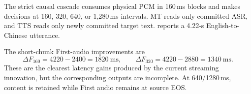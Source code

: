 \documentclass[11pt,a4paper]{article}
\begin{document}
The strict causal cascade consumes physical PCM in 160\,ms blocks and makes decisions at 160, 320, 640, or 1,280\,ms intervals. MT reads only committed ASR, and TTS reads only newly committed target text.  reports a 4.22-s English-to-Chinese utterance.

\begin{table}[H]
\centering
\caption{English-to-Chinese Stage A/B First audio and content. Times are in ms; LAAL is a proxy.}
\label{tab:en2zh_latency}
\end{table}

The short-chunk First-audio improvements are
\begin{equation}
 \Delta F_{160}=4220-2400=1820\ \mathrm{ms},\qquad
 \Delta F_{320}=4220-2880=1340\ \mathrm{ms}.
 \label{eq:firstaudio_gain}
\end{equation}
These are the clearest latency gains produced by the current streaming innovation, but the corresponding outputs are incomplete. At 640/1280\,ms, content is retained while First audio remains at source EOS.
\end{document}
